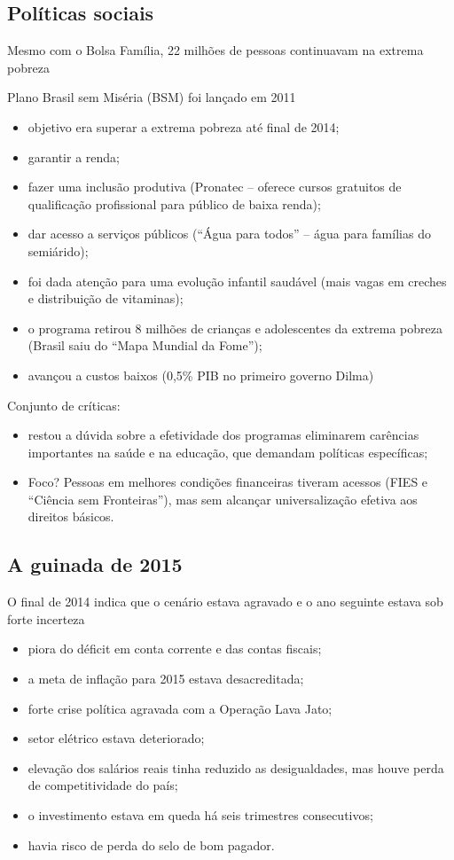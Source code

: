 \documentclass[a4paper,12pt]{article}[abntex2]
\begin{document}
\subsection{\textbf{Políticas sociais}}
Mesmo com o Bolsa Família, 22 milhões de pessoas continuavam na extrema pobreza

Plano Brasil sem Miséria (BSM) foi lançado em 2011

\begin{itemize}
    \item objetivo era superar a extrema pobreza até final de 2014;
    \item garantir a renda;
    \item fazer uma inclusão produtiva (Pronatec – oferece cursos gratuitos de qualificação profissional para público de baixa renda);
    \item dar acesso a serviços públicos (“Água para todos” – água para famílias do semiárido);
    \item foi dada atenção para uma evolução infantil saudável (mais vagas em creches e distribuição de vitaminas);
    \item o programa retirou 8 milhões de crianças e adolescentes da extrema pobreza (Brasil saiu do “Mapa Mundial da Fome”);
    \item avançou a custos baixos (0,5\% PIB no primeiro governo Dilma)
\end{itemize}

Conjunto de críticas:

\begin{itemize}
    \item restou a dúvida sobre a efetividade dos programas eliminarem carências importantes na saúde e na educação, que demandam políticas específicas;
    \item Foco? Pessoas em melhores condições financeiras tiveram acessos (FIES e “Ciência sem Fronteiras”), mas sem alcançar universalização efetiva aos direitos básicos.
\end{itemize}

\subsection{\textbf{A guinada de 2015}}
O final de 2014 indica que o cenário estava agravado e o ano seguinte estava sob forte incerteza

\begin{itemize}
    \item piora do déficit em conta corrente e das contas fiscais;
    \item a meta de inflação para 2015 estava desacreditada;
    \item forte crise política agravada com a Operação Lava Jato;
    \item setor elétrico estava deteriorado;
    \item elevação dos salários reais tinha reduzido as desigualdades, mas houve perda de competitividade do país;
    \item o investimento estava em queda há seis trimestres consecutivos;
    \item havia risco de perda do selo de bom pagador.
\end{itemize}
\end{document}
